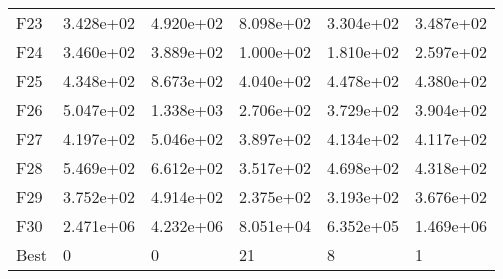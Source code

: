 \begin{tabular}{llllll}
F23  &  3.428e+02 &  4.920e+02 &  8.098e+02 &  3.304e+02 &  3.487e+02 \\
F24  &  3.460e+02 &  3.889e+02 &  1.000e+02 &  1.810e+02 &  2.597e+02 \\
F25  &  4.348e+02 &  8.673e+02 &  4.040e+02 &  4.478e+02 &  4.380e+02 \\
F26  &  5.047e+02 &  1.338e+03 &  2.706e+02 &  3.729e+02 &  3.904e+02 \\
F27  &  4.197e+02 &  5.046e+02 &  3.897e+02 &  4.134e+02 &  4.117e+02 \\
F28  &  5.469e+02 &  6.612e+02 &  3.517e+02 &  4.698e+02 &  4.318e+02 \\
F29  &  3.752e+02 &  4.914e+02 &  2.375e+02 &  3.193e+02 &  3.676e+02 \\
F30  &  2.471e+06 &  4.232e+06 &  8.051e+04 &  6.352e+05 &  1.469e+06 \\
Best &          0 &          0 &         21 &          8 &          1 \\
\bottomrule
\end{tabular}
